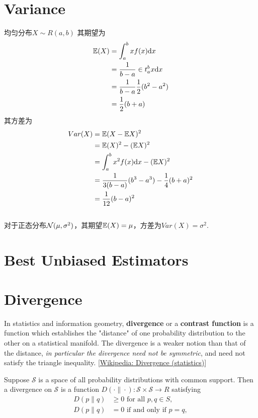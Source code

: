 \section{Variance}
均匀分布$X \sim R(a, b)$
其期望为
\begin{equation}
    \begin{split}
        \mathbb{E}(X) &= \int_{a}^{b}x f(x) \mathrm{d} x		\\
        &= \frac{1}{b-a}\in t_{a}^{b}x \mathrm{d} x	\\
        &= \frac{1}{b-a} \frac{1}{2} (b^2 - a^2)	\\
        &= \frac{1}{2}(b + a)
    \end{split}
\end{equation}
其方差为
\begin{equation}
    \begin{split}
        Var(X) &= \mathbb{E}(X - \mathbb{E} X)^2  \\
        &= \mathbb{E}(X)^2 - (\mathbb{E} X)^2 \\
        &= \int_{a}^{b} x^2 f(x) \mathrm{d} x - (\mathbb{E} X)^2 \\
        &= \frac{1}{3(b-a)} (b^3 - a^3) - \frac{1}{4}(b+a)^2 \\
        &= \frac{1}{12}(b-a)^2
    \end{split}
\end{equation}
\\
对于正态分布$\mathcal{N}(\mu, \sigma ^2)$，其期望$\mathbb{E}(X) = \mu$，方差为$Var(X) = \sigma^2$.


\section{Best Unbiased Estimators}


\section{Divergence}
In statistics and information geometry, \textbf{divergence} or a \textbf{contrast function} is a function
which establishes the "distance" of one probability distribution to the other on a statistical manifold.
The divergence is a weaker notion than that of the distance, \textit{in particular the divergence need not be symmetric},
and need not satisfy the triangle inequality. [\href{https://en.wikipedia.org/wiki/Divergence_(statistics)}{Wikipedia: Divergence (statistics)}]

Suppose $\mathcal{S}$ is a space of all probability distributions with common support.
Then a divergence on $\mathcal{S}$ is a function $D(\cdot\|\cdot): \mathcal{S} \times \mathcal{S} \rightarrow R$ satisfying
\begin{equation}
    \begin{split}
        D(p\|q) &\geq 0 \text{ for all }p, q \in S, \\
        D(p\|q) &= 0\text{ if and only if }p = q,
    \end{split}
\end{equation}

